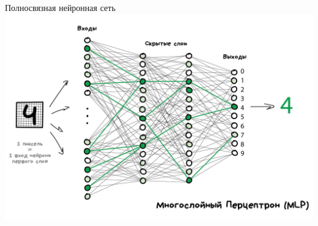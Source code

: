 \documentclass[aspectratio=169]{beamer}
\begin{document}
\begin{frame}{Полносвязная нейронная сеть}
    \centering
    \includegraphics[width=.71\linewidth]{figures/fig17.jpg}
\end{frame}
\end{document}
